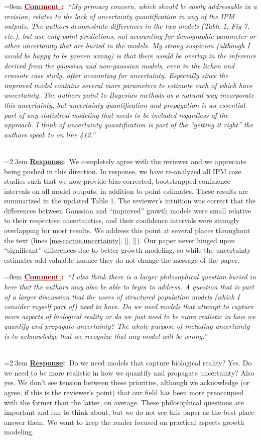 \documentclass[12pt]{article}
\newcounter{cN}
\newcommand{\comment}[1]{
	\vspace{2em}
	\refstepcounter{cN} %
	\noindent \hangindent=0em \textbf{\textcolor{Maroon}{\uline{Comment \thecN}:~}}\emph{``#1''}
	}
\newcommand{\response}[1]{
	\\[0.25em]
	\hangindent=2.3em \textbf{\textcolor{NavyBlue}{\uline{Response}:~}}#1
	}
\begin{document}
\comment{My primary concern, which should be easily addressable in a revision, relates to the lack of uncertainty quantification in any of the IPM outputs. The authors demonstrate differences in the two models (Table 1, Fig 7, etc.), but use only point predictions, not accounting for demographic parameter or other uncertainty that are buried in the models. My strong suspicion (although I would be happy to be proven wrong) is that there would be overlap in the inference derived from the gaussian and non-gaussian models, even in the lichen and creosote case study, after accounting for uncertainty. Especially since the improved model contains several more parameters to estimate each of which have uncertainty. The authors point to Bayesian methods as a natural way incorporate this uncertainty, but uncertainty quantification and propagation is an essential part of any statistical modeling that needs to be included regardless of the approach. I think of uncertainty quantification is part of the “getting it right” the authors speak to on line 412.}
\response{We completely agree with the reviewer and we appreciate being pushed in this direction. In response, we have re-analyzed all IPM case studies such that we now provide bias-corrected, bootstrapped confidence intervals on all model outputs, in addition to point estimates. These results are summarized in the updated Table 1. The reviewer's intuition was correct that the differences between Gaussian and ``improved'' growth models were small relative to their respective uncertainties, and their confidence intervals were strongly overlapping for most results. We address this point at several places throughout the text (lines \ref{ms-cactus.uncertainty}, \ref{}, \ref{}). Our paper never hinged upon ``significant'' differences due to better growth modeling, so while the uncertainty estimates add valuable nuance they do not change the message of the paper.}

\comment{I also think there is a larger philosophical question buried in here that the authors may also be able to begin to address. A question that is part of a larger discussion that the users of structured population models (which I consider myself part of) need to have.  Do we need models that attempt to capture more aspects of biological reality or do we just need to be more realistic in how we quantify and propagate uncertainty? The whole purpose of including uncertainty is to acknowledge that we recognize that any model will be wrong.}
\response{Do we need models that capture biological reality? Yes. Do we need to be more realistic in how we quantify and propagate uncertainty? Also yes. We don't see tension between these priorities, although we acknowledge (or agree, if this is the reviewer's point) that our field has been more preoccupied with the former than the latter, on average. These philosophical questions are important and fun to think about, but we do not see this paper as the best place answer them. We want to keep the reader focused on practical aspects growth modeling.}
\end{document}
